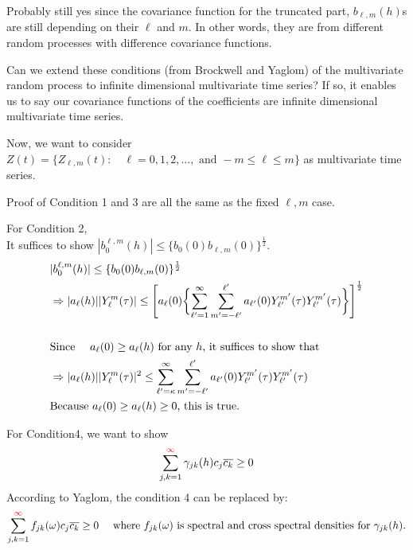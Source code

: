 \documentclass[11pt]{article}
\begin{document}
\begin{itemize}
{\item
Probably still yes since the covariance function for the truncated part, $b_{\ell,m}(h)$s are still depending on their $\ell$ and $m$. In other words, they are from different random processes with difference covariance functions.\\

\item 
Can we extend these conditions (from Brockwell and Yaglom) of the multivariate random process to infinite dimensional multivariate time series? If so, it enables us to say our covariance functions of the coefficients are infinite dimensional multivariate time series.\\
}

\pagebreak

\item
Now, we want to consider $Z(t) = \{Z_{\ell,m}(t): \quad \ell=0,1,2,..., \text{ and } -m \le \ell \le m \}$ as multivariate time series.\\

\item
Proof of Condition 1 and 3 are all the same as the fixed $\ell,m$ case.\\

\item
For Condition 2,\\
It suffices to show $|b_{0}^{\ell,m}(h)| \le \{b_{0}(0) b_{\ell,m}(0)\}^\frac{1}{2}$.\\
\begin{align*}
&|b_{0}^{\ell,m}(h)| \le \{b_{0}(0) b_{\ell,m}(0)\}^\frac{1}{2}\\
&\Rightarrow |a_{\ell}(h)||Y_{\ell}^{m}(\tau)| \le \Biggl[ a_{\ell}(0) \biggl\{ \sum_{{\ell}'=1}^{\infty} \sum_{m'=-\ell'}^{\ell'} a_{{\ell}'}(0) Y_{{\ell}'}^{{m}'}(\tau) Y_{{\ell}'}^{{m}'}(\tau) \biggl\} \Biggl]^\frac{1}{2}\\
\\
&\text{Since \quad $a_{\ell}(0) \ge a_{\ell}(h)$ for any $h$, it suffices to show that }\\
&\Rightarrow |a_{\ell}(h)||Y_{\ell}^{m}(\tau)|^2 \le \sum_{{\ell}'=\kappa}^{\infty} \sum_{m'=-\ell'}^{\ell'} a_{{\ell}'}(0) Y_{{\ell}'}^{{m}'}(\tau) Y_{{\ell}'}^{{m}'}(\tau)\\
&\text{Because $a_\ell(0) \ge a_\ell(h)  \ge 0$, this is true.}\\
\end{align*}

\item
For Condition4, we want to show\\
$$\sum_{j,k=1}^{{\color{red}\infty}} \gamma_{jk}(h) c_j \overline{c_k} \ge 0$$
According to Yaglom, the condition 4 can be replaced by:\\
$$\sum_{j,k=1}^{{\color{red}\infty}} f_{jk}(\omega) c_j \overline{c_k} \ge 0 \quad \text{ where } f_{jk}(\omega) \text{ is spectral and cross spectral densities for } \gamma_{jk}(h).$$


\end{itemize}
\end{document}
